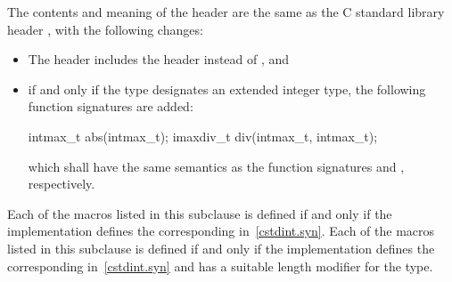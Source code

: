 \pnum
The contents and meaning of the header 
are the same as the C standard library header ,
with the following changes:
\begin{itemize}
\item
The header  includes the header  instead
of , and
\item
if and only if the type  designates an extended integer
type, the following function signatures are added:
\begin{codeblock}
intmax_t abs(intmax_t);
imaxdiv_t div(intmax_t, intmax_t);
\end{codeblock}
which shall have the same semantics as the function signatures
 and
, respectively.
\end{itemize}


\pnum
Each of the  macros listed in this subclause
is defined if and only if the implementation
defines the corresponding  in~\ref{cstdint.syn}.
Each of the  macros listed in this subclause
is defined if and only if the implementation
defines the corresponding  in~\ref{cstdint.syn} and
has a suitable  length modifier for the type.
